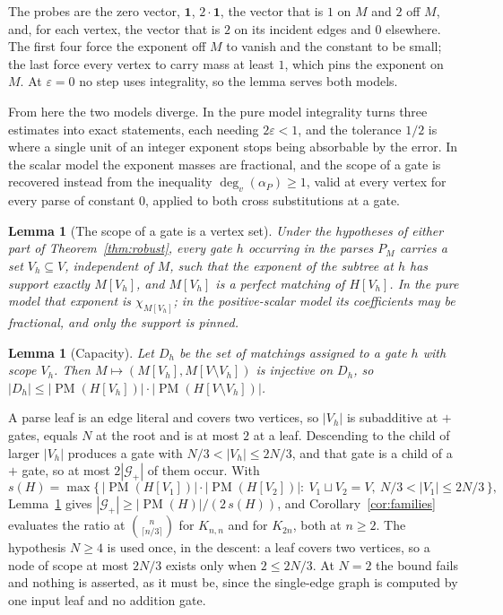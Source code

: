 \documentclass[11pt]{article}
\newtheorem{lemma}[theorem]{Lemma}
\newcommand{\PM}{\operatorname{PM}}
\begin{document}
The probes are the zero vector, $\mathbf1$, $2\cdot\mathbf1$, the vector that is
$1$ on $M$ and $2$ off $M$, and, for each vertex, the vector that is $2$ on its
incident edges and $0$ elsewhere.  The first four force the exponent off $M$ to
vanish and the constant to be small; the last force every vertex to carry mass
at least $1$, which pins the exponent on $M$.  At $\varepsilon=0$ no step uses
integrality, so the lemma serves both models.

From here the two models diverge.  In the pure model integrality turns three
estimates into exact statements, each needing $2\varepsilon<1$, and the tolerance
$1/2$ is where a single unit of an integer exponent stops being absorbable by
the error.  In the scalar model the exponent masses are fractional, and the
scope of a gate is recovered instead from the inequality $\deg_v(\alpha_P)\ge1$,
valid at every vertex for every parse of constant $0$, applied to both cross
substitutions at a gate.

\begin{lemma}[The scope of a gate is a vertex set]
\label{lem:scope}
Under the hypotheses of either part of Theorem~\ref{thm:robust}, every gate $h$
occurring in the parses $P_M$ carries a set $V_h\subseteq V$, independent of
$M$, such that the exponent of the subtree at $h$ has support exactly $M[V_h]$,
and $M[V_h]$ is a perfect matching of $H[V_h]$.  In the pure model that exponent
is $\chi_{M[V_h]}$; in the positive-scalar model its coefficients may be
fractional, and only the support is pinned.
\end{lemma}

\begin{lemma}[Capacity]
\label{lem:rect}
Let $D_h$ be the set of matchings assigned to a gate $h$ with scope $V_h$.  Then
$M\mapsto(M[V_h],M[V\setminus V_h])$ is injective on $D_h$, so
$|D_h|\le|\PM(H[V_h])|\cdot|\PM(H[V\setminus V_h])|$.
\end{lemma}

A parse leaf is an edge literal and covers two vertices, so $|V_h|$ is
subadditive at $+$ gates, equals $N$ at the root and is at most $2$ at a leaf.
Descending to the child of larger $|V_h|$ produces a gate with
$N/3<|V_h|\le2N/3$, and that gate is a child of a $+$ gate, so at most
$2|\mathcal G_+|$ of them occur.  With
\[
  s(H)=\max\bigl\{\,|\PM(H[V_1])|\cdot|\PM(H[V_2])|:\ V_1\sqcup V_2=V,\
  N/3<|V_1|\le2N/3\,\bigr\},
\]
Lemma~\ref{lem:rect} gives $|\mathcal G_+|\ge|\PM(H)|/(2\,s(H))$, and
Corollary~\ref{cor:families} evaluates the ratio at $\binom{n}{\lceil
n/3\rceil}$ for $K_{n,n}$ and for $K_{2n}$, both at $n\ge2$.  The hypothesis
$N\ge4$ is used once, in the descent: a leaf covers two vertices, so a node of
scope at most $2N/3$ exists only when $2\le2N/3$.  At $N=2$ the bound fails and
nothing is asserted, as it must be, since the single-edge graph is computed by
one input leaf and no addition gate.
\end{document}

